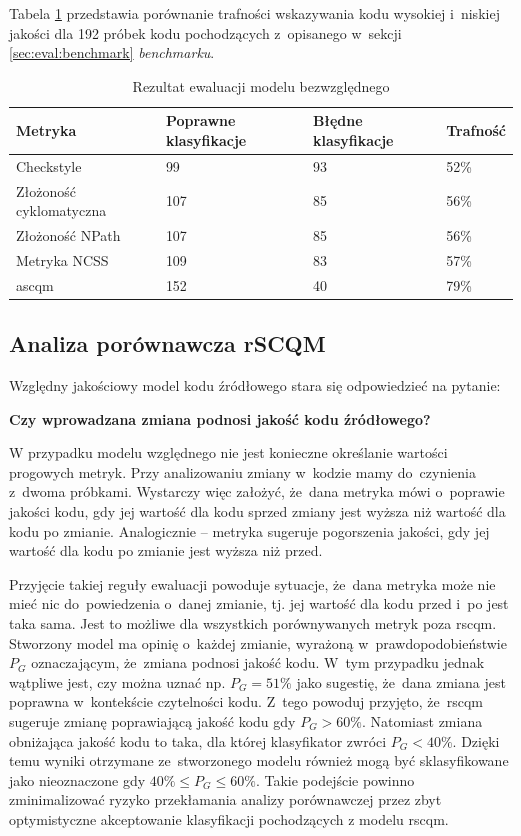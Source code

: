\documentclass[twoside]{praca}
\begin{document}
Tabela \ref{tbl:eval:ascqm} przedstawia porównanie trafności wskazywania kodu wysokiej i~niskiej jakości dla 192 próbek kodu pochodzących z~opisanego w~sekcji \ref{sec:eval:benchmark} \textit{benchmarku}.

\begin{table}[h]
\centering
\caption{Rezultat ewaluacji modelu bezwzględnego}
\label{tbl:eval:ascqm}
\begin{tabular}{|p{}|p{}|p{}|p{}|}
  \hline 
  \textbf{Metryka} & \textbf{Poprawne klasyfikacje} & \textbf{Błędne \hphantom{2mm} klasyfikacje} & \textbf{Trafność} \\ \hline
  Checkstyle & 99 & 93 & 52\% \\ \hline
  Złożoność cyklomatyczna & 107 & 85 & 56\% \\ \hline
  Złożoność NPath & 107 & 85 & 56\% \\ \hline
  Metryka NCSS & 109 & 83 & 57\% \\ \hline
  \gls{ascqm} & 152 & 40 & \cellcolor{green!25}79\% \\ \hline
\end{tabular} 
\end{table}

\subsection{Analiza porównawcza rSCQM}
\label{sec:eval:rscqm}

Względny jakościowy model kodu źródłowego stara się odpowiedzieć na pytanie: 
\centerline{\textbf{Czy wprowadzana zmiana podnosi jakość kodu źródłowego?}}

W przypadku modelu względnego nie jest konieczne określanie wartości progowych metryk. Przy analizowaniu zmiany w~kodzie mamy do~czynienia z~dwoma próbkami. Wystarczy więc założyć, że~dana metryka mówi o~poprawie jakości kodu, gdy jej wartość dla kodu sprzed zmiany jest wyższa niż wartość dla kodu po zmianie. Analogicznie -- metryka sugeruje pogorszenia jakości, gdy jej wartość dla kodu po zmianie jest wyższa niż przed.

Przyjęcie takiej reguły ewaluacji powoduje sytuacje, że~dana metryka może nie mieć nic do~powiedzenia o~danej zmianie, tj. jej wartość dla kodu przed i~po jest taka sama. Jest to możliwe dla wszystkich porównywanych metryk poza \gls{rscqm}. Stworzony model ma opinię o~każdej zmianie, wyrażoną w~prawdopodobieństwie $P_G$ oznaczającym, że~zmiana podnosi jakość kodu. W~tym przypadku jednak wątpliwe jest, czy można uznać np. $P_G=51\%$ jako sugestię, że~dana zmiana jest poprawna w~kontekście czytelności kodu. Z~tego powoduj przyjęto, że~\gls{rscqm} sugeruje zmianę poprawiającą jakość kodu gdy $P_G>60\%$. Natomiast zmiana obniżająca jakość kodu to taka, dla której klasyfikator zwróci $P_G<40\%$. Dzięki temu wyniki otrzymane ze~stworzonego modelu również mogą być sklasyfikowane jako nieoznaczone gdy $40\%\leq P_G\leq60\%$. Takie podejście powinno zminimalizować ryzyko przekłamania analizy porównawczej przez zbyt optymistyczne akceptowanie klasyfikacji pochodzących z modelu \gls{rscqm}.
\end{document}
